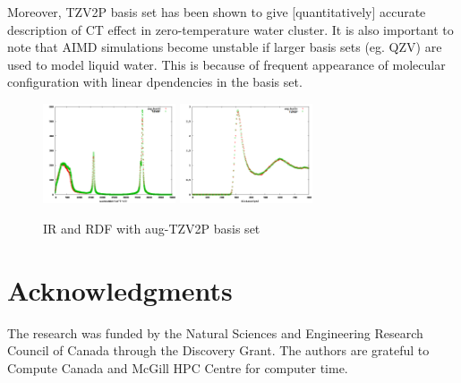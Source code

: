 \documentclass[prl,twocolumn,showpacs]{revtex4}
\begin{document}
Moreover, TZV2P basis set has been shown to give [quantitatively] accurate description of CT effect in zero-temperature water cluster. It is also important to note that AIMD simulations become unstable if larger basis sets (eg. QZV) are used to model liquid water. This is because of frequent appearance of molecular configuration with linear dpendencies in the basis set.

\begin{figure}
\includegraphics[width=0.35\textwidth]{aug_ir}
\includegraphics[width=0.35\textwidth]{aug_rdf}
\caption{IR and RDF with aug-TZV2P basis set}\label{Fig:basis}
\end{figure} 

\section{Acknowledgments} 

The research was funded by the Natural Sciences and Engineering Research Council of Canada through the Discovery Grant. The authors are grateful to Compute Canada and McGill HPC Centre for computer time.


\end{document}
